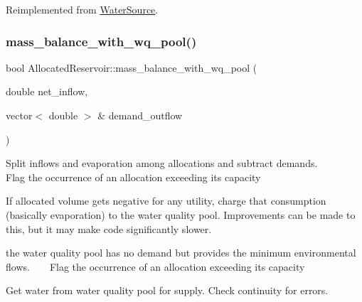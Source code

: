 Reimplemented from \mbox{\hyperlink{classWaterSource_a71cb8bd481bbce0089aa78dcd1c3309a_a71cb8bd481bbce0089aa78dcd1c3309a}{Water\+Source}}.

\mbox{\label{classAllocatedReservoir_a9d025365aa42dfff13a0aac8ea7863fa_a9d025365aa42dfff13a0aac8ea7863fa}} 
\subsubsection{\texorpdfstring{mass\+\_\+balance\+\_\+with\+\_\+wq\+\_\+pool()}{mass\_balance\_with\_wq\_pool()}}
{\footnotesize\ttfamily bool Allocated\+Reservoir\+::mass\+\_\+balance\+\_\+with\+\_\+wq\+\_\+pool (\begin{DoxyParamCaption}\item[{double}]{net\+\_\+inflow,  }\item[{vector$<$ double $>$ \&}]{demand\+\_\+outflow }\end{DoxyParamCaption})}

Split inflows and evaporation among allocations and subtract demands. ~\newline
~\newline
~\newline
~\newline
~\newline
 Flag the occurrence of an allocation exceeding its capacity

If allocated volume gets negative for any utility, charge that consumption (basically evaporation) to the water quality pool. Improvements can be made to this, but it may make code significantly slower.

the water quality pool has no demand but provides the minimum environmental flows. ~\newline
~\newline
 Flag the occurrence of an allocation exceeding its capacity

Get water from water quality pool for supply. Check continuity for errors. \mbox{\label{classAllocatedReservoir_ac719b30d5a83ba19ea722449ce9580e1_ac719b30d5a83ba19ea722449ce9580e1}} 
